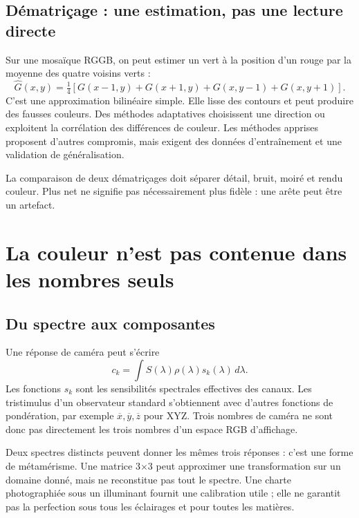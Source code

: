 \subsection{Dématriçage : une estimation, pas une lecture directe}
Sur une mosaïque RGGB, on peut estimer un vert à la position
d'un rouge par la moyenne des quatre voisins verts :
\begin{equation}
\widehat G(x,y)=\tfrac14[G(x-1,y)+G(x+1,y)+G(x,y-1)+G(x,y+1)].
\end{equation}
C'est une approximation bilinéaire simple. Elle lisse des
contours et peut produire des fausses couleurs. Des méthodes
adaptatives choisissent une direction ou exploitent la
corrélation des différences de couleur. Les méthodes
apprises proposent d'autres compromis, mais exigent des
données d'entraînement et une validation de généralisation.

La comparaison de deux dématriçages doit séparer détail,
bruit, moiré et rendu couleur. Plus net ne signifie pas
nécessairement plus fidèle : une arête peut être un artefact.

\section{La couleur n'est pas contenue dans les nombres seuls}
\subsection{Du spectre aux composantes}
Une réponse de caméra peut s'écrire
\begin{equation}
c_k=\int S(\lambda)\rho(\lambda)s_k(\lambda)\,d\lambda.
\end{equation}
Les fonctions $s_k$ sont les sensibilités spectrales effectives
des canaux. Les tristimulus d'un observateur standard
s'obtiennent avec d'autres fonctions de pondération, par
exemple $\overline x,\overline y,\overline z$ pour XYZ.
Trois nombres de caméra ne sont donc pas directement les
trois nombres d'un espace RGB d'affichage.

Deux spectres distincts peuvent donner les mêmes trois
réponses : c'est une forme de métamérisme. Une matrice
3$\times$3 peut approximer une transformation sur un domaine
donné, mais ne reconstitue pas tout le spectre. Une charte
photographiée sous un illuminant fournit une calibration
utile ; elle ne garantit pas la perfection sous tous les
éclairages et pour toutes les matières.

